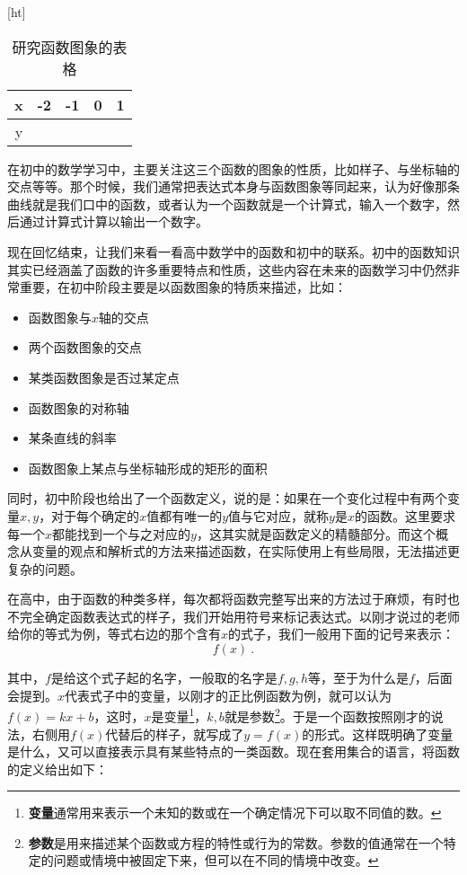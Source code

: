 \begin{table}\label{tab_functi_1}[ht]
\centering
\caption{研究函数图象的表格}\label{tab_functi1}
\begin{tabular}{|c|c|c|c|c|}
\hline
x & -2 & -1 & 0 & 1 \\
\hline
y &   &   &   &   \\
\hline
\end{tabular}
\end{table}

在初中的数学学习中，主要关注这三个函数的图象的性质，比如样子、与坐标轴的交点等等。那个时候，我们通常把表达式本身与函数图象等同起来，认为好像那条曲线就是我们口中的函数，或者认为一个函数就是一个计算式，输入一个数字，然后通过计算式计算以输出一个数字。

现在回忆结束，让我们来看一看高中数学中的函数和初中的联系。初中的函数知识其实已经涵盖了函数的许多重要特点和性质，这些内容在未来的函数学习中仍然非常重要，在初中阶段主要是以函数图象的特质来描述，比如：
\begin{itemize}
\item 函数图象与$x$轴的交点
\item 两个函数图象的交点
\item 某类函数图象是否过某定点
\item 函数图象的对称轴
\item 某条直线的斜率
\item 函数图象上某点与坐标轴形成的矩形的面积
\end{itemize}

同时，初中阶段也给出了一个函数定义，说的是：如果在一个变化过程中有两个变量$x,y$，对于每个确定的$x$值都有唯一的$y$值与它对应，就称$y$是$x$的函数。这里要求每一个$x$都能找到一个与之对应的$y$，这其实就是函数定义的精髓部分。而这个概念从变量的观点和解析式的方法来描述函数，在实际使用上有些局限，无法描述更复杂的问题。

在高中，由于函数的种类多样，每次都将函数完整写出来的方法过于麻烦，有时也不完全确定函数表达式的样子，我们开始用符号来标记表达式。以刚才说过的老师给你的等式为例，等式右边的那个含有$x$的式子，我们一般用下面的记号来表示：
\begin{equation}
f(x)~.
\end{equation}

其中，$f$是给这个式子起的名字，一般取的名字是$f,g,h$等，至于为什么是$f$，后面会提到。$x$代表式子中的变量，以刚才的正比例函数为例，就可以认为$f(x)=kx+b$，这时，$x$是变量\footnote{\textbf{变量}通常用来表示一个未知的数或在一个确定情况下可以取不同值的数。}，$k,b$就是参数\footnote{\textbf{参数}是用来描述某个函数或方程的特性或行为的常数。参数的值通常在一个特定的问题或情境中被固定下来，但可以在不同的情境中改变。}。于是一个函数按照刚才的说法，右侧用$f(x)$代替后的样子，就写成了$y=f(x)$的形式。这样既明确了变量是什么，又可以直接表示具有某些特点的一类函数。现在套用集合的语言，将函数的定义给出如下：

